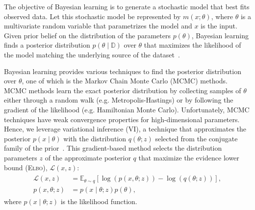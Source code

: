 The objective of Bayesian learning is to generate a stochastic model that best
fits observed data. Let this stochastic model be represented by $m(x; \theta)$,
where $\theta$ is a multivariate random variable that parametrizes the model and
$x$ is the input. Given prior belief on the distribution of the parameters
$p(\theta)$, Bayesian learning finds a posterior distribution $p(\theta \mid
\mathbb{D})$ over $\theta$ that maximizes the likelihood of the model matching
the underlying source of the dataset~\cite{bishop2006pattern}. 


Bayesian learning provides various techniques to find the posterior distribution
over $\theta$, one of which is the Markov Chain Monte Carlo (MCMC) methods. MCMC
methods learn the exact posterior distribution by collecting samples of $\theta$
either through a random walk (e.g. Metropolis-Hastings) or by following the
gradient of the likelihood (e.g. Hamiltonian Monte Carlo). Unfortunately, MCMC
techniques have weak convergence properties for high-dimensional parameters.
Hence, we leverage variational inference (VI), a technique that approximates the
posterior $p(x \mid \theta)$ with the distribution $q(\theta;z)$ selected from
the conjugate family of the prior~\cite{cohen2016bayesian}.
%
%
This gradient-based method selects the distribution parameters $z$ of the
approximate posterior $q$ that maximize the evidence lower bound (\textsc{Elbo}),
$\mathcal{L}(x, z)$:
\begin{align}
  \begin{split}
  \mathcal{L}(x,z) &= \mathbb{E}_{\theta \sim q} \left[\log(p(x, \theta;z)) - \log(q(\theta;z)) \right], \\
  p(x, \theta;z) &= p(x \mid \theta;z)p(\theta),
  \end{split}
  \label{eq:elbo}
\end{align}
where $p(x \mid \theta;z)$ is the likelihood function. 

%
%
%
%

